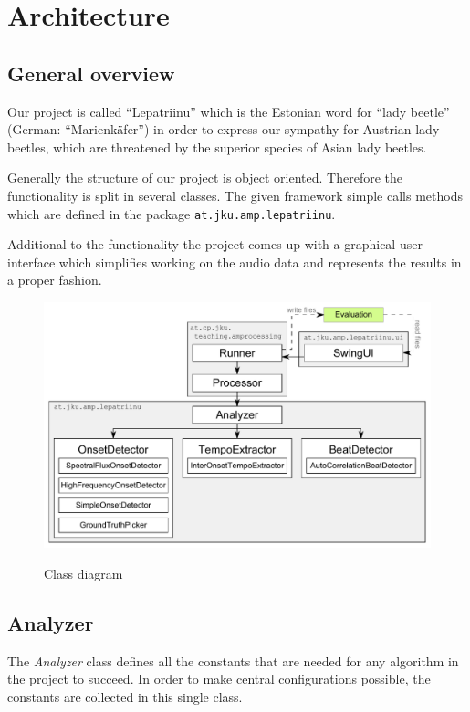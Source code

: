 \chapter{Architecture} \label{cpt:architecture}
\section{General overview} \label{sec:classes}
Our project is called ``Lepatriinu'' which is the Estonian word for ``lady
beetle'' (German: ``Marienkäfer'') in order to express our sympathy for Austrian
lady beetles, which are threatened by the superior species of Asian lady
beetles.

Generally the structure of our project is object oriented. Therefore the
functionality is split in several classes. The given framework simple calls
methods which are defined in the package \texttt{at.jku.amp.lepatriinu}.

Additional to the functionality the project comes up with a graphical user
interface which simplifies working on the audio data and represents the results
in a proper fashion.

\begin{figure}[htp]
  \centering
  \includegraphics[width=\textwidth]{chapter/ClassDiagram}
  \label{fig:classdiagram}
  \caption{Class diagram}
\end{figure}

\section{\ttfamily Analyzer} \label{sec:analyzer}
The \emph{Analyzer} class defines all the constants that are needed for any
algorithm in the project to succeed. In order to make central configurations
possible, the constants are collected in this single class.

